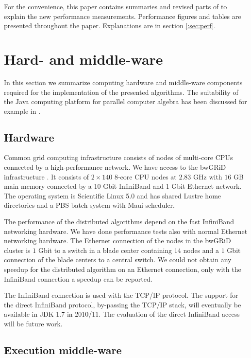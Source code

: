 \documentclass[10pt,twocolumn,a4paper]{article}
\begin{document}
For the convenience, this paper contains summaries and revised parts
of \cite{Kredel:2009,Kredel:2010} to explain the new performance
measurements.  Performance figures and tables are presented throughout
the paper.  Explanations are in section \ref{:sec:perf}.


\section{Hard- and middle-ware} 

In this section we summarize computing hardware and middle-ware
components required for the implementation of the presented
algorithms.  The suitability of the Java computing platform for
parallel computer algebra has been discussed for example in
\cite{Kredel:2009,Kredel:2010}.  


\subsection{Hardware} \label{sec:hardware}

Common grid computing infrastructure consists of nodes of multi-core
CPUs connected by a high-performance network. We have access to the
bwGRiD infrastructure \cite{bwgrid:2008}.
It consists of $2 \times 140$ $8$-core CPU nodes
at $2.83$ GHz with $16$ GB main memory connected by a $10$ Gbit InfiniBand and
$1$ Gbit Ethernet network.  The operating system is Scientific Linux 5.0
and has shared Lustre home directories and a PBS batch system with
Maui scheduler.

The performance of the distributed algorithms depend on the fast
Infini\-Band networking hard\-ware. We have done performance tests
also with normal Ether\-net networking hard\-ware.  The Ethernet
connection of the nodes in the bw\-GRiD cluster is $1$ Gbit to a
switch in a blade center containing $14$ nodes and a $1$ Gbit
connection of the blade centers to a central switch.  We could not
obtain any speedup for the distributed algorithm on an Ether\-net
connection, only with the Infini\-Band connection a speedup can be
reported.

The Infini\-Band connection is used with the TCP/IP protocol. The
support for the direct Infini\-Band protocol, by-passing the TCP/IP
stack, will eventually be available in JDK 1.7 in 2010/11. The evaluation
of the direct Infini\-Band access will be future work.


\subsection{Execution middle-ware} 
\end{document}
